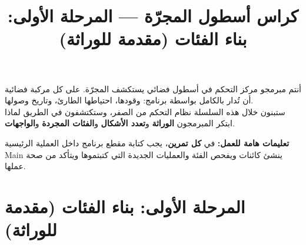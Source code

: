 \documentclass[14pt]{extarticle}
\title{كراس أسطول المجرّة — المرحلة الأولى: بناء الفئات (مقدمة للوراثة)}
\begin{document}
\maketitle
\thispagestyle{fancy}

\begin{boxDef}
أنتم مبرمجو مركز التحكم في أسطول فضائي يستكشف المجرّة. على كل مركبة فضائية أن تُدار بالكامل بواسطة برنامج: وقودها، احتياطها الطارئ، وتاريخ وصولها. \\
ستبنون خلال هذه السلسلة نظام التحكم من الصفر، وستكتشفون في الطريق لماذا ابتكر المبرمجون \textbf{الوراثة} و\textbf{تعدد الأشكال} و\textbf{الفئات المجردة} و\textbf{الواجهات}.
\end{boxDef}

\begin{boxWarning}
\textbf{تعليمات هامة للعمل:}
في \textbf{كل تمرين}، يجب كتابة مقطع برنامج داخل العملية الرئيسية \textenglish{Main} ينشئ كائنات ويفحص الفئة والعمليات الجديدة التي كتبتموها ويتأكد من صحة عملها.
\end{boxWarning}

\section*{المرحلة الأولى: بناء الفئات (مقدمة للوراثة)}
\end{document}

